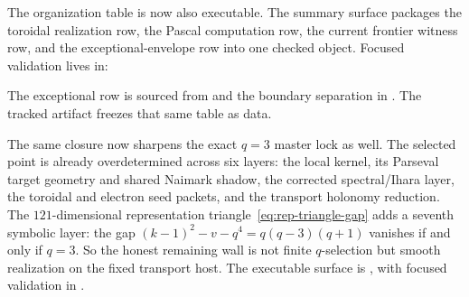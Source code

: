 \documentclass[12pt,a4paper]{article}
\def\textbf#1{#1}%
\theoremstyle{definition}
\begin{document}
The organization table is now also executable.  The summary surface
 packages the
toroidal realization row, the Pascal computation row, the current
frontier witness row, and the exceptional-envelope row into one checked
object.  Focused validation lives in:
{\small\par\noindent{}\par}
The
exceptional row is sourced from
 and the boundary
separation in .
The tracked artifact
freezes that same table as data.

The same closure now sharpens the exact $q=3$ master lock as well.  The
selected point is already overdetermined across six layers: the local
kernel, its Parseval target geometry and shared Naimark shadow, the
corrected spectral/Ihara layer, the toroidal and electron seed packets,
and the transport holonomy reduction.  The $121$-dimensional
representation triangle~\eqref{eq:rep-triangle-gap} adds a
\textbf{seventh} symbolic layer: the gap $(k-1)^2 - v - q^4 =
q(q-3)(q+1)$ vanishes if and only if $q=3$.  So the honest remaining
wall is not finite $q$-selection but smooth realization on the fixed
transport host.
The executable surface is
, with focused
validation in
.
\end{document}
